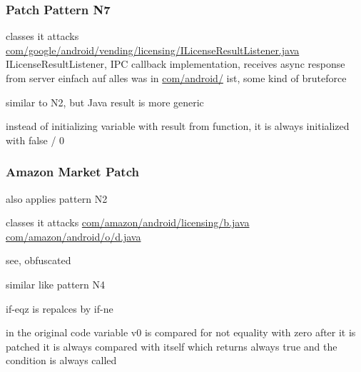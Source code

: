 \subsubsection{Patch Pattern N7}
classes it attacks %
\url{com/google/android/vending/licensing/ILicenseResultListener.java}
ILicenseResultListener, IPC callback implementation, receives async response from server\cite{developersLicensingReference}
einfach auf alles was in \url{com/android/} ist, some kind of bruteforce

similar to N2, but Java result is more generic



instead of initializing variable with result from function, it is always initialized with false / 0
\subsubsection{Amazon Market Patch}
also applies pattern N2

classes it attacks %
\url{com/amazon/android/licensing/b.java}
\url{com/amazon/android/o/d.java}

see, obfuscated

similar like pattern N4



if-eqz is repalces by if-ne


in the original code variable v0 is compared for not equality with zero
after it is patched it is always compared with itself which returns always true and the condition is always called




